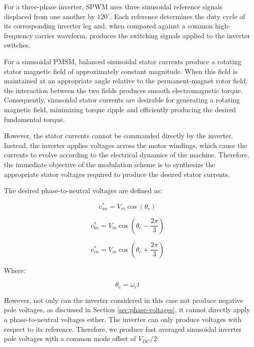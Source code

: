 \documentclass{article}
\begin{document}
For a three-phase inverter, SPWM uses three sinusoidal reference signals displaced from one another by $120^\circ$. Each reference determines the duty cycle of its corresponding inverter leg and, when compared against a common high-frequency carrier waveform, produces the switching signals applied to the inverter switches.

For a sinusoidal PMSM, balanced sinusoidal stator currents produce a rotating stator magnetic field of approximately constant magnitude. When this field is maintained at an appropriate angle relative to the permanent-magnet rotor field, the interaction between the two fields produces smooth electromagnetic torque. Consequently, sinusoidal stator currents are desirable for generating a rotating magnetic field, minimizing torque ripple and efficiently producing the desired fundamental torque.

However, the stator currents cannot be commanded directly by the inverter. Instead, the inverter applies voltages across the motor windings, which cause the currents to evolve according to the electrical dynamics of the machine. Therefore, the immediate objective of the modulation scheme is to synthesize the appropriate stator voltages required to produce the desired stator currents.

The desired phase-to-neutral voltages are defined as:

\begin{equation}
    v_{an}^* = V_m\cos(\theta_e)
\end{equation}

\begin{equation}
    v_{bn}^* = V_m\cos(\theta_e - \frac{2\pi}{3})
\end{equation}

\begin{equation}
    v_{cn}^* = V_m\cos(\theta_e + \frac{2\pi}{3})
\end{equation}

Where:

\begin{equation}
    \theta_e = \omega_e t
\end{equation}

However, not only can the inverter considered in this case not produce negative pole voltages, as discussed in Section \ref{sec:phase-voltages}, it cannot directly apply a phase-to-neutral voltages either. The inverter can only produce voltages with respect to its reference. Therefore, we produce fast averaged sinusoidal inverter pole voltages with a common mode offset of $V_{DC}/2$:
\end{document}
